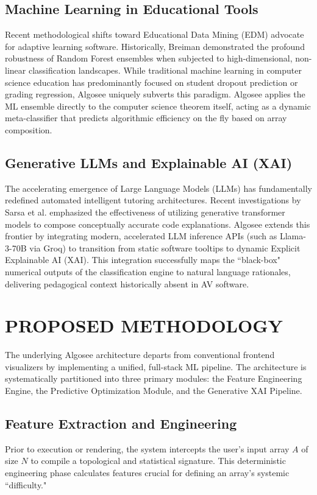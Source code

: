 \documentclass[conference]{IEEEtran}
\begin{document}
\subsection{Machine Learning in Educational Tools}
Recent methodological shifts toward Educational Data Mining (EDM) advocate for adaptive learning software. Historically, Breiman \cite{breiman2001random} demonstrated the profound robustness of Random Forest ensembles when subjected to high-dimensional, non-linear classification landscapes. While traditional machine learning in computer science education has predominantly focused on student dropout prediction or grading regression, Algosee uniquely subverts this paradigm. Algosee applies the ML ensemble directly to the computer science theorem itself, acting as a dynamic meta-classifier that predicts algorithmic efficiency on the fly based on array composition.

\subsection{Generative LLMs and Explainable AI (XAI)}
The accelerating emergence of Large Language Models (LLMs) has fundamentally redefined automated intelligent tutoring architectures. Recent investigations by Sarsa et al. \cite{sarsa2022automatic} emphasized the effectiveness of utilizing generative transformer models to compose conceptually accurate code explanations. Algosee extends this frontier by integrating modern, accelerated LLM inference APIs (such as Llama-3-70B via Groq) to transition from static software tooltips to dynamic Explicit Explainable AI (XAI). This integration successfully maps the ``black-box" numerical outputs of the classification engine to natural language rationales, delivering pedagogical context historically absent in AV software.

\section{PROPOSED METHODOLOGY}
The underlying Algosee architecture departs from conventional frontend visualizers by implementing a unified, full-stack ML pipeline. The architecture is systematically partitioned into three primary modules: the Feature Engineering Engine, the Predictive Optimization Module, and the Generative XAI Pipeline.

\subsection{Feature Extraction and Engineering}
Prior to execution or rendering, the system intercepts the user's input array $A$ of size $N$ to compile a topological and statistical signature. This deterministic engineering phase calculates features crucial for defining an array's systemic ``difficulty." 
\end{document}
